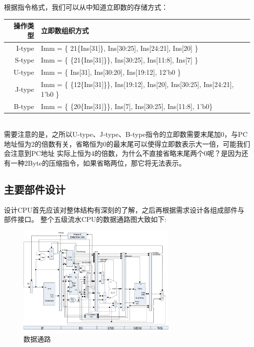 根据指令格式，我们可以从中知道立即数的存储方式：\\

\begin{tabular}{|r|l|}
    \hline
    操作类型 & 立即数组织方式 \\
    \hline 
    I-type & Imm = \{ {21\{Ins[31]}\}, Ins[30:25], Ins[24:21], Ins[20] \} \\
    \hline
    S-type & Imm = \{ \{21\{Ins[31]\}\}, Ins[30:25], Ins[11:8], Ins[7] \} \\
    \hline
    U-type & Imm = \{ Ins[31], Ins[30:20], Ins[19:12], 12'b0 \} \\
    \hline
    J-type & Imm = \{ \{12\{Ins[31]\}\}, Ins[19:12], Ins[20], Ins[30:25], Ins[24:21], 1'b0 \} \\
    \hline
    B-type & Imm = \{ \{20\{Ins[31]\}\}, Ins[7], Ins[30:25], Ins[11:8], 1'b0\} \\
    \hline
\end{tabular} \\

需要注意的是，之所以U-type、J-type、B-type指令的立即数需要末尾加0，与PC地址恒为2的倍数有关，省略恒为0的最末尾可以使得立即数表示大一倍，可能我们会注意到PC地址
实际上恒为4的倍数，为什么不直接省略末尾两个0呢？是因为还有一种2Byte的压缩指令，如果省略两位，那它将无法表示。

\subsection{主要部件设计}
设计CPU首先应该对整体结构有深刻的了解，之后再根据需求设计各组成部件与部件接口。
整个五级流水CPU的数据通路图大致如下:

\begin{figure}[H] %
    \centering %
    \includegraphics[width=0.7\textwidth]{DataPath.png} %
    \caption{数据通路} %
    \label{Fig.2} %
\end{figure}

